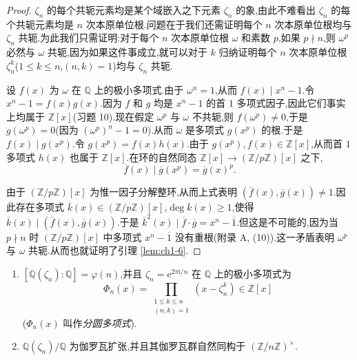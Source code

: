 \begin{proof}
$\zeta_n$ 的每个共轭元素均是某个域嵌入之下元素 $\zeta_n$ 的象,由此不难看出 $\zeta_n$ 的每个共轭元素均是 $n$ 次本原单位根.问题在于我们还需证明每个 $n$ 次本原单位根均与 $\zeta_n$ 共轭.为此我们只需证明:对于每个 $n$ 次本原单位根 $\omega$ 和素数 $p$,如果 $p\nmid n$,则 $\omega^p$ 必然与 $\omega$ 共轭,因为如果这件事成立,就可以对于 $k$ 归纳证明每个 $n$ 次本原单位根 $\zeta_n^k$($1\leqslant k\leqslant n$,$(n,k)=1$)均与 $\zeta_n$ 共轭.

设 $f(x)$ 为 $\omega$ 在 $\mathbb{Q}$ 上的极小多项式.由于 $\omega^n=1$,从而 $f(x)\mid x^n-1$.令 $x^n-1=f(x)g(x)$.因为 $f$ 和 $g$ 均是 $x^n-1$ 的首 $1$ 多项式因子,因此它们事实上均属于 $\mathbb{Z}[x]$(习题 10).现在假定 $\omega^p$ 与 $\omega$ 不共轭,则 $f(\omega^p)\neq 0$,于是 $g(\omega^p)=0$(因为 $(\omega^p)^n-1=0$).从而 $\omega$ 是多项式 $g(x^p)$ 的根.于是 $f(x)\mid g(x^p)$.令 $g(x^p)=f(x)h(x)$.由于 $g(x^p),f(x)\in\mathbb{Z}[x]$,从而首 $1$ 多项式 $h(x)$ 也属于 $\mathbb{Z}[x]$.在环的自然同态 $\mathbb{Z}[x]\to(\mathbb{Z}/p\mathbb{Z})[x]$ 之下,
\[
  \overline{f}(x)\mid\overline{g}(x^p)=\overline{g}(x)^p.
\]
\begin{sloppypar}
由于 $(\mathbb{Z}/p\mathbb{Z})[x]$ 为惟一因子分解整环,从而上式表明 $(\overline{f}(x),\overline{g}(x))\neq 1$.因此存在多项式 $\overline{k}(x)\in(\mathbb{Z}/p\mathbb{Z})[x]$,$\deg\overline{k}(x)\geqslant 1$,使得 $\overline{k}(x)\mid(\overline{f}(x),\overline{g}(x))$.于是 $\overline{k}^2(x)\mid\overline{f}\cdot\overline{g}=x^n-\overline{1}$.但这是不可能的,因为当 $p\nmid n$ 时 $(\mathbb{Z}/p\mathbb{Z})[x]$ 中多项式 $x^n-\overline{1}$ 没有重根(附录 A, (10)).这一矛盾表明 $\omega^p$ 与 $\omega$ 共轭.从而也就证明了引理 \ref{lem:ch1-6}.
\end{sloppypar}
\end{proof}

\begin{theorem}\label{thm:1.6}
\begin{enumerate}[(1)]
  \item $[\mathbb{Q}(\zeta_n):\mathbb{Q}]=\varphi(n)$,并且 $\zeta_n=\mathrm{e}^{2\pi\mathrm{i}/n}$ 在 $\mathbb{Q}$ 上的极小多项式为
        \[
          \Phi_n(x)=\prod_{\substack{1\leqslant k\leqslant n\\ (n,k)=1}}(x-\zeta_n^k)\in\mathbb{Z}[x]
        \]
        ($\Phi_n(x)$ 叫作\emph{分圆多项式}).
  \item $\mathbb{Q}(\zeta_n)/\mathbb{Q}$ 为伽罗瓦扩张,并且其伽罗瓦群自然同构于 $(\mathbb{Z}/n\mathbb{Z})^\times$.
\end{enumerate}
\end{theorem}

